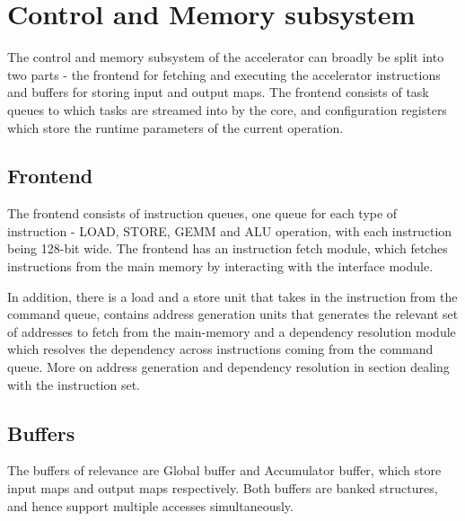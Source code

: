 \section{Control and Memory subsystem}
The control and memory subsystem of the accelerator can broadly be split into two parts - the frontend for fetching and executing the accelerator instructions and buffers for storing input and output maps. The frontend consists of task queues to which tasks are streamed into by the core, and configuration registers which store the runtime parameters of the current operation.

\subsection{Frontend}
The frontend consists of instruction queues, one queue for each type of instruction - LOAD, STORE, GEMM and ALU operation, with each instruction being 128-bit wide. The frontend has an instruction fetch module, which fetches instructions from the main memory by interacting with the interface module.

In addition, there is a load and a store unit that takes in the instruction from the command queue, contains address generation units that generates the relevant set of addresses to fetch from the main-memory and a dependency resolution module which resolves the dependency across instructions coming from the command queue. More on address generation and dependency resolution in section dealing with the instruction set. 




\subsection{Buffers}
The buffers of relevance are Global buffer and Accumulator buffer, which store input maps and output maps respectively. Both buffers are banked structures, and hence support multiple accesses simultaneously.

